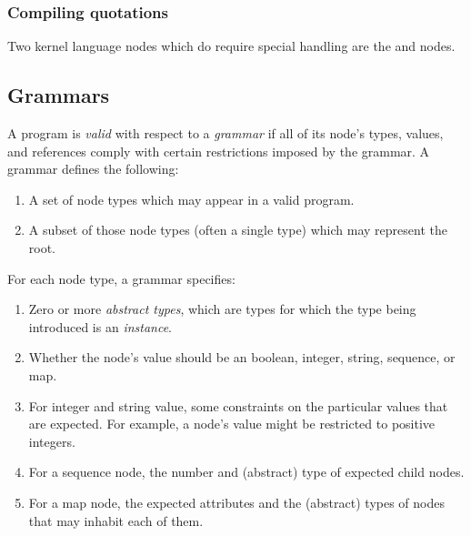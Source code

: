 \subsubsection{Compiling quotations}
Two kernel language nodes which do require special handling are the  and  nodes. \todo{}




\subsection{Grammars}


A program is \emph{valid} with respect to a \emph{grammar} if all of its node's types, values, and references comply with certain restrictions imposed by the grammar. A grammar defines the following:
\begin{enumerate}
\item A set of node types which may appear in a valid program.
\item A subset of those node types (often a single type) which may represent the root.
\end{enumerate}

For each node type, a grammar specifies:
\begin{enumerate}
\item Zero or more \emph{abstract types}, which are types for which the type being introduced is an \emph{instance}.
\item Whether the node's value should be an boolean, integer, string, sequence, or map.
\item For integer and string value, some constraints on the particular values that are expected. For example, a node's value might be restricted to positive integers.
\item For a sequence node, the number and (abstract) type of expected child nodes.
\item For a map node, the expected attributes and the (abstract) types of nodes that may inhabit each of them.
\end{enumerate}



